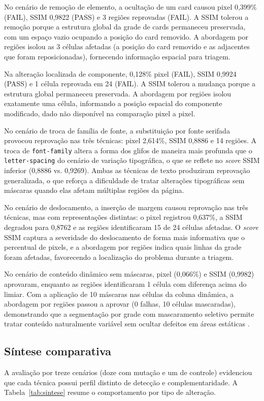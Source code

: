 \documentclass{UNESC}
\begin{document}
No cenário de remoção de elemento, a ocultação de um card causou pixel 0,399\% (FAIL), SSIM 0,9822 (PASS) e 3 regiões reprovadas (FAIL). A SSIM tolerou a remoção porque a estrutura global da grade de cards permaneceu preservada, com um espaço vazio ocupando a posição do card removido. A abordagem por regiões isolou as 3 células afetadas (a posição do card removido e as adjacentes que foram reposicionadas), fornecendo informação espacial para triagem.

Na alteração localizada de componente, 0,128\% pixel (FAIL), SSIM 0,9924 (PASS) e 1 célula reprovada em 24 (FAIL). A SSIM tolerou a mudança porque a estrutura global permaneceu preservada. A abordagem por regiões isolou exatamente uma célula, informando a posição espacial do componente modificado, dado não disponível na comparação pixel a pixel.

No cenário de troca de família de fonte, a substituição por fonte serifada provocou reprovação nas três técnicas: pixel 2,614\%, SSIM 0,8886 e 14 regiões. A troca de \texttt{font-family} altera a forma dos glifos de maneira mais profunda que o \texttt{letter-spacing} do cenário de variação tipográfica, o que se reflete no \emph{score} SSIM inferior (0,8886 vs. 0,9269). Ambas as técnicas de texto produziram reprovação generalizada, o que reforça a dificuldade de tratar alterações tipográficas sem máscaras quando elas afetam múltiplas regiões da página.

No cenário de deslocamento, a inserção de margem causou reprovação nas três técnicas, mas com representações distintas: o pixel registrou 0,637\%, a SSIM degradou para 0,8762 e as regiões identificaram 15 de 24 células afetadas. O \emph{score} SSIM captura a severidade do deslocamento de forma mais informativa que o percentual de pixels, e a abordagem por regiões indica quais linhas da grade foram afetadas, favorecendo a localização do problema durante a triagem.

No cenário de conteúdo dinâmico sem máscaras, pixel (0,066\%) e SSIM (0,9982) aprovaram, enquanto as regiões identificaram 1 célula com diferença acima do limiar. Com a aplicação de 10 máscaras nas células da coluna dinâmica, a abordagem por regiões passou a aprovar (0 falhas, 10 células mascaradas), demonstrando que a segmentação por grade com mascaramento seletivo permite tratar conteúdo naturalmente variável sem ocultar defeitos em áreas estáticas \cite{tanno2020}.

\subsection{Síntese comparativa}
A avaliação por treze cenários (doze com mutação e um de controle) evidenciou que cada técnica possui perfil distinto de detecção e complementaridade. A Tabela~\ref{tab:sintese} resume o comportamento por tipo de alteração.
\end{document}

